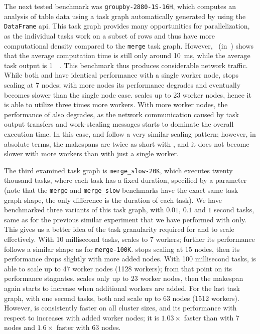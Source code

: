 The next tested benchmark was \texttt{groupby-2880-1S-16H}, which computes an analysis of table data
using a task graph automatically generated by \dask{} using the
\texttt{DataFrame} \gls{api}. This task graph provides many
opportunities for parallelization, as the individual tasks work on a subset of rows and thus have
more computational density compared to the \texttt{merge} task graph.
However,~ (in~) shows that the average computation time is still only around
\SI{10}{\milli\second}, while the average task output is \SI{1}{\mebi\byte}. This
benchmark thus produces considerable network traffic. While both \dask{} and
\rsds{} have identical performance with a single worker node,
\dask{} stops scaling at \num{7} nodes; with more nodes its
performance degrades and eventually becomes slower than the single node case.
\rsds{} scales up to \num{23} worker nodes, hence it is able
to utilize three times more workers. With more worker nodes, the performance of
\rsds{} also degrades, as the network communication caused by task output
transfers and work-stealing messages starts to dominate the overall execution time. In this case,
\dask{} and \rsds{} follow a very similar scaling pattern;
however, in absolute terms, the makespans are twice as short with \rsds{}, and
it does not become slower with more workers than with just a single worker.

The third examined task graph is \texttt{merge\_slow-20K}, which executes twenty thousand tasks,
where each task has a fixed duration, specified by a parameter (note that the
\texttt{merge} and \texttt{merge\_slow} benchmarks have the exact same task
graph shape, the only difference is the duration of each task). We have benchmarked three variants
of this task graph, with $0.01$, $0.1$ and
$1$ second tasks, same as for the previous similar experiment that we have
performed with \dask{} only. This gives us a better idea of the task
granularity required for \dask{} and \rsds{} to scale
effectively. With \num{10} millisecond tasks, \dask{} scales
to \num{7} workers; further its performance follows a similar shape as for
\texttt{merge-100K}. \rsds{} stops scaling at
\num{15} nodes, then its performance drops slightly with more added nodes. With
\num{100} millisecond tasks, \rsds{} is able to scale up to
\num{47} worker nodes (\num{1128} workers); from that point on
its performance stagnates. \dask{} scales only up to \num{23}
worker nodes, then the makespan again starts to increase when additional workers are added. For the
last task graph, with one second tasks, both \rsds{} and
\dask{} scale up to \num{63} nodes
(\num{1512} workers). However, \rsds{} is consistently faster
on all cluster sizes, and its performance with respect to \dask{} increases
with added worker nodes; it is $1.03\times$ faster than \dask{}
with \num{7} nodes and $1.6\times$ faster with
\num{63} nodes.


